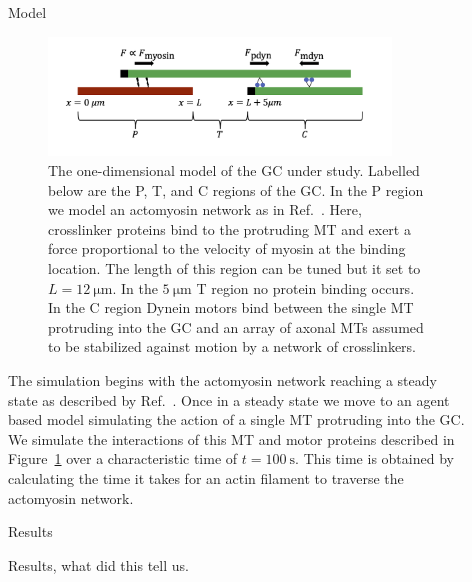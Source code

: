 \documentclass{beamer}
\newlength{\sepwidth}
\newlength{\colwidth}
\newcommand{\separatorcolumn}{\begin{column}{\sepwidth}\end{column}}
\begin{document}
\begin{frame}[t]
\begin{columns}[t]
\begin{column}{\colwidth}
\begin{block}{Model}
\begin{figure}
    \centering
    \includegraphics[width=0.9\textwidth]{figures/model/model.png}
    \caption{\label{fig:main_model}
        The one-dimensional model of the GC under study. Labelled below are the P, T, and C regions of the GC. In the P region we model an actomyosin network as in Ref.~\cite{craig2012bj}. Here, crosslinker proteins bind to the protruding MT and exert a force proportional to the velocity of myosin at the binding location. The length of this region can be tuned but it set to \(L=\qty{12}{\micro\meter}\). In the \(\qty{5}{\micro\meter}\) T region no protein binding occurs. In the C region Dynein motors bind between the single MT protruding into the GC and an array of axonal MTs assumed to be stabilized against motion by a network of crosslinkers.
    }
\end{figure}

The simulation begins with the actomyosin network reaching a steady state as described by Ref.~\cite{craig2012bj}. Once in a steady state we move to an agent based model simulating the action of a single MT protruding into the GC. We simulate the interactions of this MT and motor proteins described in Figure~\ref{fig:main_model} over a characteristic time of \(t=\qty{100}{\second}\). This time is obtained by calculating the time it takes for an actin filament to traverse the actomyosin network.

\end{block}

\begin{block}{Results}

Results, what did this tell us.

\end{block}

\end{column}
\separatorcolumn%


\begin{column}{\colwidth}


\end{column}
\end{columns}
\end{frame}
\end{document}
